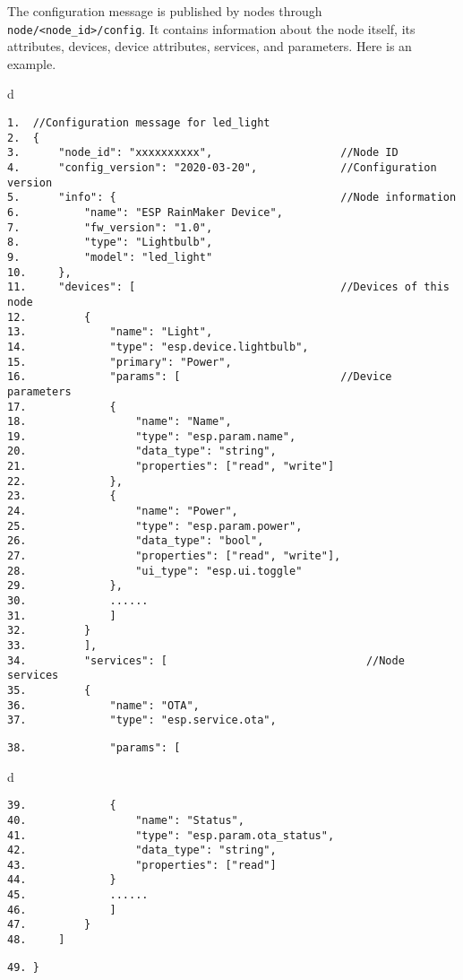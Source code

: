 \documentclass[a4paper,12pt]{book}
\begin{document}
The configuration message is published by nodes through \verb|node/<node_id>/config|. It contains information about the node itself, its attributes, devices, device attributes, services, and parameters. Here is an example.

\begin{codebloc}
\begin{tabular}{d}
\vspace{2pt}
\begin{verbatim}
1.  //Configuration message for led_light
2.  {
3.      "node_id": "xxxxxxxxxx",                    //Node ID
4.      "config_version": "2020-03-20",             //Configuration version
5.      "info": {                                   //Node information
6.          "name": "ESP RainMaker Device",
7.          "fw_version": "1.0",
8.          "type": "Lightbulb",
9.          "model": "led_light"
10.     },
11.     "devices": [                                //Devices of this node
12.         {
13.             "name": "Light",
14.             "type": "esp.device.lightbulb",
15.             "primary": "Power",
16.             "params": [                         //Device parameters
17.             {
18.                 "name": "Name",
19.                 "type": "esp.param.name",
20.                 "data_type": "string",
21.                 "properties": ["read", "write"]
22.             },
23.             {
24.                 "name": "Power",
25.                 "type": "esp.param.power",
26.                 "data_type": "bool",
27.                 "properties": ["read", "write"],
28.                 "ui_type": "esp.ui.toggle"
29.             },
30.             ......
31.             ]
32.         }
33.         ],
34.         "services": [                       		//Node services
35.         {
36.             "name": "OTA",
37.             "type": "esp.service.ota",
\end{verbatim}
\verb|38.             "params": [|
\end{tabular}
\end{codebloc}

\begin{codebloc}
\begin{tabular}{d}
\vspace{2pt}
\begin{verbatim}
39.             {
40.                 "name": "Status",
41.                 "type": "esp.param.ota_status",
42.                 "data_type": "string",
43.                 "properties": ["read"]
44.             }
45.             ......
46.             ]
47.         }
48.     ]
\end{verbatim}
\verb|49. }|
\end{tabular}
\end{codebloc}
\end{document}
